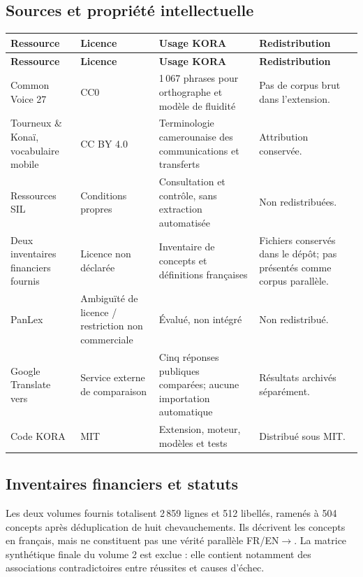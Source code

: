 \subsection{Sources et propriété intellectuelle}

\begin{longtable}{@{}|L{43mm}|L{29mm}|L{43mm}|L{37mm}|@{}}
\hline
\textbf{Ressource} & \textbf{Licence} & \textbf{Usage KORA} &
\textbf{Redistribution}\\
\hline
\endfirsthead
\hline
\textbf{Ressource} & \textbf{Licence} & \textbf{Usage KORA} &
\textbf{Redistribution}\\
\hline
\endhead
Common Voice 27  &
CC0 &
1\,067 phrases pour orthographe et modèle de fluidité &
Pas de corpus brut dans l’extension.\\
\hline
Tourneux \& Konaï, vocabulaire mobile &
CC BY 4.0 &
Terminologie camerounaise des communications et transferts &
Attribution conservée.\\
\hline
Ressources SIL  &
Conditions propres &
Consultation et contrôle, sans extraction automatisée &
Non redistribuées.\\
\hline
Deux inventaires financiers fournis &
Licence non déclarée &
Inventaire de concepts et définitions françaises &
Fichiers conservés dans le dépôt; pas présentés comme corpus parallèle.\\
\hline
PanLex  &
Ambiguïté de licence / restriction non commerciale &
Évalué, non intégré &
Non redistribué.\\
\hline
Google Translate vers  &
Service externe de comparaison &
Cinq réponses publiques comparées; aucune importation automatique &
Résultats archivés séparément.\\
\hline
Code KORA &
MIT &
Extension, moteur, modèles et tests &
Distribué sous MIT.\\
\hline
\end{longtable}

\subsection{Inventaires financiers et statuts}

Les deux volumes fournis totalisent 2\,859 lignes et 512 libellés, ramenés à
504 concepts après déduplication de huit chevauchements. Ils décrivent les
concepts en français, mais ne constituent pas une vérité parallèle
FR/EN$\rightarrow$. La matrice synthétique finale du volume 2 est
exclue : elle contient notamment des associations contradictoires entre
réussites et causes d’échec.

